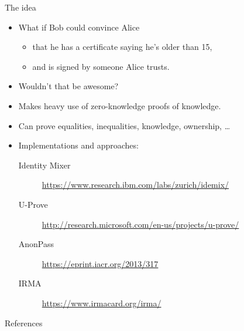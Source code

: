 \documentclass{beamer}
\begin{document}
\begin{frame}
  \begin{block}{The idea}
    \begin{itemize}
      \item What if Bob could convince Alice
        \begin{itemize}
          \item that he has a certificate saying he's older than 15,
          \item and is signed by someone Alice trusts.
        \end{itemize}
      \item Wouldn't that be awesome?
    \end{itemize}
  \end{block}
\end{frame}

\begin{frame}
  \begin{example}
    \begin{itemize}
      \item Makes heavy use of zero-knowledge proofs of knowledge.
      \item Can prove equalities, inequalities, knowledge, ownership, \dots
      \item Implementations and approaches:
        \begin{description}
          \item[Identity Mixer]
            \url{https://www.research.ibm.com/labs/zurich/idemix/}
          \item[U-Prove]
            \url{http://research.microsoft.com/en-us/projects/u-prove/}
          \item[AnonPass]
            \url{https://eprint.iacr.org/2013/317}
          \item[IRMA]
            \url{https://www.irmacard.org/irma/}
        \end{description}
    \end{itemize}
  \end{example}
\end{frame}



\begin{frame}{References}
	\small
  \printbibliography{}
\end{frame}
\end{document}
